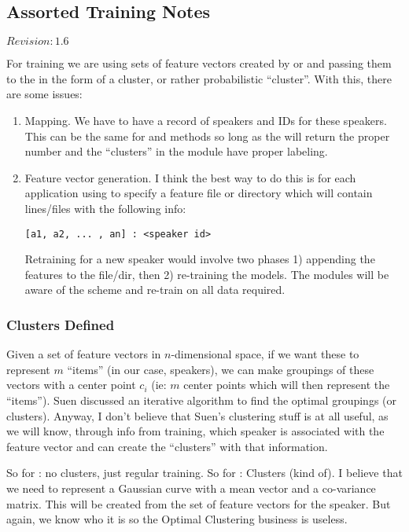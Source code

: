 \subsection{Assorted Training Notes}

$Revision: 1.6 $

For training we are using sets of feature vectors created by  or
 and passing them to the  in the form of a 
cluster, or rather probabilistic ``cluster''. With this, there are some
issues:

\begin{enumerate}
\item
Mapping. We have to have a record of speakers and IDs for these speakers.
This can be the same for  and  methods so long as the 
will return the proper number and the ``clusters'' in the  module have
proper labeling.

\item
Feature vector generation. I think the best way to do this is for each
application using {\marf} to specify a feature file or directory which will
contain lines/files with the following info:

\verb+[a1, a2, ... , an] : <speaker id>+

Retraining for a new speaker would involve two phases 1) appending the
features to the file/dir, then 2) re-training the models. The
 modules will be aware of the scheme and re-train on all data
required.
\end{enumerate}

\subsubsection{Clusters Defined}

Given a set of feature vectors in $n$-dimensional space, if we want these to
represent $m$ ``items'' (in our case, speakers), we can make groupings of
these vectors with a center point $c_{i}$ (ie: $m$ center points which will
then represent the ``items''). Suen discussed an iterative algorithm to find
the optimal groupings (or clusters).
Anyway, I don't believe that Suen's clustering stuff is at all useful, as
we will know, through info from training, which speaker is associated with
the feature vector and can create the ``clusters'' with that information.

So for : no clusters, just regular training.
So for : Clusters (kind of). I believe that we need to represent
a Gaussian curve with a mean vector and a co-variance matrix. This will be
created from the set of feature vectors for the speaker. But again, we know
who it is so the Optimal Clustering business is useless.

